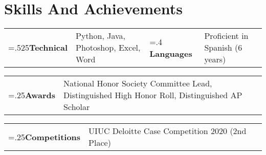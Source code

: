 \documentclass[10pt]{article}
\newcommand{\onelinecontent}[2]
    {
        \small\textbf{#1} & #2
    }
\begin{document}
                                                \section{Skills And Achievements}
                    \begin{flushleft}
                                                            \begin{tabularx}{\linewidth}{
                        >{\hsize=.525\hsize}X%
                        >{\hsize=1.475\hsize}X%
                        >{\hsize=.4\hsize}X%
                        >{\hsize=1.6\hsize}X%
                        }
                        \onelinecontent{Technical}{Python, Java, Photoshop, Excel, Word}  &   \onelinecontent{Languages}{Proficient in Spanish (6 years)} \\
                        \end{tabularx}
                                                                                \begin{tabularx}{\linewidth}{
                            >{\hsize=.25\hsize}X%
                            >{\hsize=1.75\hsize}X%
                            }
                            \onelinecontent{Awards}{National Honor Society Committee Lead, Distinguished High Honor Roll, Distinguished AP Scholar} \\
                        \end{tabularx}
                                                                                \begin{tabularx}{\linewidth}{
                            >{\hsize=.25\hsize}X%
                            >{\hsize=1.75\hsize}X%
                            }
                            \onelinecontent{Competitions}{UIUC Deloitte Case Competition 2020 (2nd Place)} \\
                        \end{tabularx}
                                    

            \end{flushleft}
            
\end{document}
